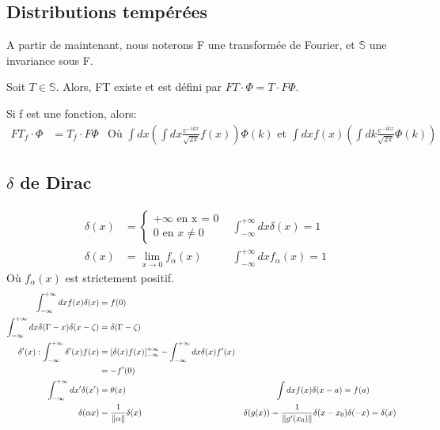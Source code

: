 \documentclass[../notesdecours.tex]{subfiles}
\begin{document}
\subsection{Distributions tempérées}
A partir de maintenant, nous noterons F une transformée de Fourier, et $\mathbb{S}$ une invariance sous F.
\begin{definition} Soit $T \in \mathbb{S}$. Alors, FT existe et est défini par $FT\cdot\Phi = T\cdot F\Phi$.
\end{definition}

Si f est une fonction, alors:
\begin{align}
FT_f\cdot\Phi &= T_f\cdot F\Phi		&\text{Où }\int dx (\int dx \frac{e^{-ikx}}{\sqrt{2\pi}}f(x))\Phi(k) \text{ et } \int dx f(x) (\int dk \frac{e^{-ikx}}{\sqrt{2\pi}}\Phi(k))
\end{align}

\subsection{$\delta$ de Dirac}
\begin{align}
\delta(x) &= \begin{cases}
+\infty \mbox{ en x = 0}\\
0 \mbox{ en } x\neq 0
\end{cases}		&\int^{+\infty}_{-\infty} dx \delta (x) = 1\\
\delta(x) &= \lim_{x\to 0} f_{\alpha}(x)	&\int^{+\infty}_{-\infty} dx f_\alpha (x) = 1
\end{align}
Où $f_\alpha (x)$ est strictement positif.
\begin{align}
\int_{-\infty}^{+\infty} dx f(x)\delta(x) &= f(0)\\
\int_{-\infty}^{+\infty} dx \delta(\Gamma - x)\delta(x- \zeta) &= \delta (\Gamma - \zeta)\\
\delta '(x) : \int^{+\infty}_{-\infty} \delta '(x)f(x) &= [\delta(x)f(x)]_{-\infty}^{+\infty} - \int_{-\infty}^{+\infty} dx \delta(x)f'(x)\\
&= -f'(0)\\
\int_{-\infty}^{+\infty} dx' \delta(x') &= \theta(x)		&\int dx f(x)\delta(x-a) = f(a)\\
\delta(\alpha x) &= \frac{1}{\norm{\alpha}}\delta(x)	&\delta(g(x)) = \frac{1}{\norm{g'(x_0)}}\delta(x-x_0)
\delta(-x) &= \delta(x)\\
\end{align}
\end{document}
